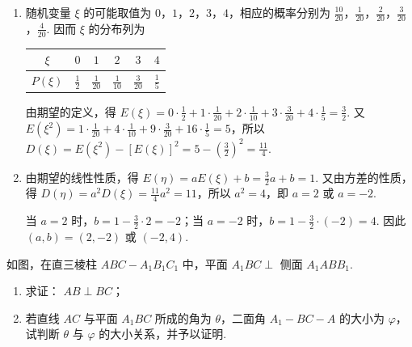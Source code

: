 \begin{solution}
\begin{enumerate}
\item 随机变量 \(\xi\) 的可能取值为 \(0\)，\(1\)，\(2\)，\(3\)，\(4\)，相应的概率分别为 \(\frac{10}{20}\)，\(\frac{1}{20}\)，\(\frac{2}{20}\)，\(\frac{3}{20}\)，\(\frac{4}{20}\). 因而 \(\xi\) 的分布列为

\begin{center}
\begin{tabular}{c|ccccc}
\hline
\(\xi\) & \(0\) & \(1\) & \(2\) & \(3\) & \(4\) \\
\hline
\(P(\xi)\) & \(\frac{1}{2}\) & \(\frac{1}{20}\) & \(\frac{1}{10}\) & \(\frac{3}{20}\) & \(\frac{1}{5}\) \\
\hline
\end{tabular}
\end{center}

由期望的定义，得 \(E(\xi)=0\cdot\frac12+1\cdot\frac1{20}+2\cdot\frac1{10}+3\cdot\frac3{20}+4\cdot\frac15=\frac32\). 又 \(E(\xi^2)=1\cdot\frac1{20}+4\cdot\frac1{10}+9\cdot\frac3{20}+16\cdot\frac15=5\)，所以 \(D(\xi)=E(\xi^2)-[E(\xi)]^2=5-\left(\frac32\right)^2=\frac{11}{4}\).

\item 由期望的线性性质，得 \(E(\eta)=aE(\xi)+b=\frac32a+b=1\). 又由方差的性质，得 \(D(\eta)=a^2D(\xi)=\frac{11}{4}a^2=11\)，所以 \(a^2=4\)，即 \(a=2\) 或 \(a=-2\).

当 \(a=2\) 时，\(b=1-\frac32\cdot2=-2\)；当 \(a=-2\) 时，\(b=1-\frac32\cdot(-2)=4\). 因此 \((a,b)=(2,-2)\) 或 \((-2,4)\).
\end{enumerate}
\end{solution}

\begin{problem}
如图，在直三棱柱 \(ABC - A_{1}B_{1}C_{1}\) 中，平面 \(A_{1}BC \perp\) 侧面 \(A_{1}ABB_{1}\).
\begin{enumerate}
\item 求证： \(AB \perp BC\)；
\item 若直线 \(AC\) 与平面 \(A_{1}BC\) 所成的角为 \(\theta\)，二面角 \(A_{1} - BC - A\) 的大小为 \(\varphi\)，试判断 \(\theta\) 与 \(\varphi\) 的大小关系，并予以证明.
\end{enumerate}


\end{problem}

